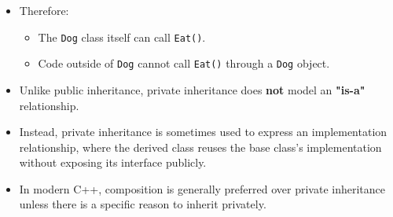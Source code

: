 \documentclass[10pt]{article}
\begin{document}
\begin{itemize}
    \item Therefore:
    \begin{itemize}
        \item The \verb|Dog| class itself can call \verb|Eat()|.
        \item Code outside of \verb|Dog| cannot call \verb|Eat()| through a
        \verb|Dog| object.
    \end{itemize}

    \item Unlike public inheritance, private inheritance does \textbf{not}
    model an \textbf{"is-a"} relationship.

    \item Instead, private inheritance is sometimes used to express an
    implementation relationship, where the derived class reuses the base
    class's implementation without exposing its interface publicly.

    \item In modern C++, composition is generally preferred over private
    inheritance unless there is a specific reason to inherit privately.
\end{itemize}

\newpage
\end{document}
